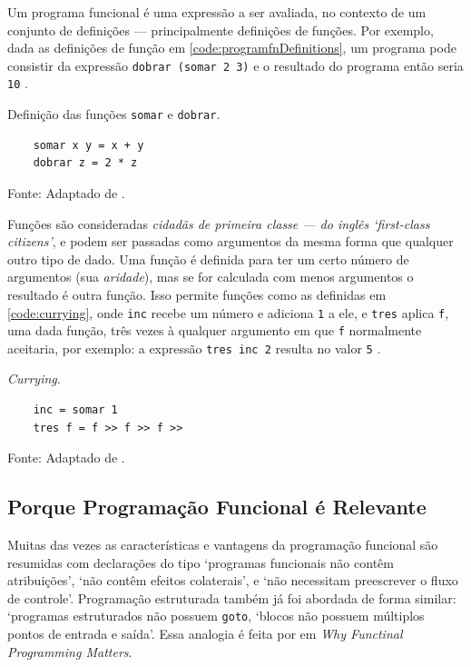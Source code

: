 Um programa funcional é uma expressão a ser avaliada, no contexto de um
conjunto de definições — principalmente definições de funções.
Por exemplo, dada as definições de função em \ref{code:programfnDefinitions}, um
programa pode consistir da expressão \texttt{dobrar (somar 2 3)} e o resultado
do programa então seria \texttt{10} \cite{noble1994}.

\begin{listing}[H]
  \centering
  \caption{Definição das funções \texttt{somar} e \texttt{dobrar}.}
  \begin{verbatim}
    somar x y = x + y
    dobrar z = 2 * z
  \end{verbatim}
  \small Fonte: Adaptado de \textcite{noble1994}.
  \label{code:programfnDefinitions}
\end{listing}

Funções são consideradas \emph{cidadãs de primeira classe — do inglês ‘first-class
citizens’}, e podem ser passadas como argumentos da mesma forma que qualquer
outro tipo de dado.
Uma função é definida para ter um certo número de argumentos (sua \emph{aridade}),
mas se for calculada com menos argumentos o resultado é outra função.
Isso permite funções como as definidas em \ref{code:currying}, onde \texttt{inc} recebe
um número e adiciona \texttt{1} a ele, e \texttt{tres} aplica \texttt{f}, uma dada função, três
vezes à qualquer argumento em que \texttt{f} normalmente aceitaria, por exemplo: a
expressão \texttt{tres inc 2} resulta no valor \texttt{5} \cite{noble1994}.

\begin{listing}[H]
  \centering \caption{\emph{Currying}.}
  \begin{verbatim}
    inc = somar 1
    tres f = f >> f >> f >>
  \end{verbatim}
  \small Fonte: Adaptado de \textcite{noble1994}.
  \label{code:currying}
\end{listing}

\subsection{Porque Programação Funcional é Relevante}
\label{sec:orgeb573e0}
Muitas das vezes as características e vantagens da programação funcional são
resumidas com declarações do tipo ‘programas funcionais não contêm
atribuições’, ‘não contêm efeitos colaterais’, e ‘não necessitam preescrever
o fluxo de controle’. Programação estruturada também já foi abordada de forma
similar: ‘programas estruturados não possuem \texttt{goto}, ‘blocos não
possuem múltiplos pontos de entrada e saída’. Essa analogia é feita por
\textcite{hughes1990} em \emph{Why Functinal Programming Matters}.

